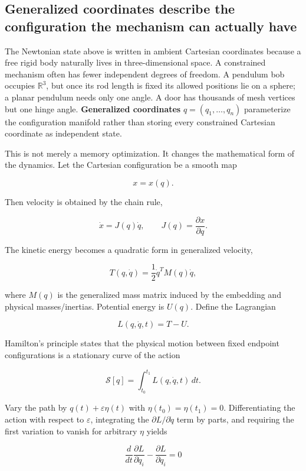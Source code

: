 \subsection{Generalized coordinates describe the configuration the mechanism can actually have}\label{02-foundations-ii-ch039-generalized-coordinates-describe-the-configuration-the-mechanism-can-actually-have}

The Newtonian state above is written in ambient Cartesian coordinates because a free rigid body naturally lives in three-dimensional space. A constrained mechanism often has fewer independent degrees of freedom. A pendulum bob occupies \(\mathbb R^3\), but once its rod length is fixed its allowed positions lie on a sphere; a planar pendulum needs only one angle. A door has thousands of mesh vertices but one hinge angle. \textbf{Generalized coordinates} \(q=(q_1,\ldots,q_n)\) parameterize the configuration manifold rather than storing every constrained Cartesian coordinate as independent state.

This is not merely a memory optimization. It changes the mathematical form of the dynamics. Let the Cartesian configuration be a smooth map

\[
x=x(q).
\]

Then velocity is obtained by the chain rule,

\[
\dot x
=
J(q)\dot q,
\qquad
J(q)=\frac{\partial x}{\partial q}.
\]

The kinetic energy becomes a quadratic form in generalized velocity,

\[
T(q,\dot q)
=
\frac12
\dot q^T M(q)\dot q,
\]

where \(M(q)\) is the generalized mass matrix induced by the embedding and physical masses/inertias. Potential energy is \(U(q)\). Define the Lagrangian

\[
L(q,\dot q,t)=T-U.
\]

Hamilton's principle states that the physical motion between fixed endpoint configurations is a stationary curve of the action

\[
\mathcal S[q]
=
\int_{t_0}^{t_1}
L(q,\dot q,t)\,dt.
\]

Vary the path by \(q(t)+\varepsilon\eta(t)\) with \(\eta(t_0)=\eta(t_1)=0\). Differentiating the action with respect to \(\varepsilon\), integrating the \(\partial L/\partial\dot q\) term by parts, and requiring the first variation to vanish for arbitrary \(\eta\) yields

\[
\boxed{
\frac{d}{dt}
\frac{\partial L}{\partial\dot q_i}
-
\frac{\partial L}{\partial q_i}
=
0
}
\]

